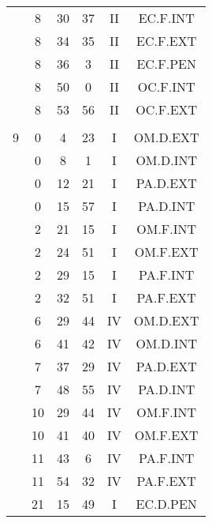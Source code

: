 \documentclass[12pt, a4paper]{article}
\begin{document}
\begin{multicols}{3}
{\begin{tabular}{c c c c c c}
	 	 	 	 & 8 & 30 & 37 & II & EC.F.INT\\%
	 	 	 	 & 8 & 34 & 35 & II & EC.F.EXT\\%
	 	 	 	 & 8 & 36 & 3 & II & EC.F.PEN\\%
	 	 	 	 & 8 & 50 & 0 & II & OC.F.INT\\%
	 	 	 	 & 8 & 53 & 56 & II & OC.F.EXT\\%
	 	 	 	 & & & & & \\%
	 	 	 	9 & 0 & 4 & 23 & I & OM.D.EXT\\%
	 	 	 	 & 0 & 8 & 1 & I & OM.D.INT\\%
	 	 	 	 & 0 & 12 & 21 & I & PA.D.EXT\\%
	 	 	 	 & 0 & 15 & 57 & I & PA.D.INT\\%
	 	 	 	 & 2 & 21 & 15 & I & OM.F.INT\\%
	 	 	 	 & 2 & 24 & 51 & I & OM.F.EXT\\%
	 	 	 	 & 2 & 29 & 15 & I & PA.F.INT\\%
	 	 	 	 & 2 & 32 & 51 & I & PA.F.EXT\\%
	 	 	 	 & 6 & 29 & 44 & IV & OM.D.EXT\\%
	 	 	 	 & 6 & 41 & 42 & IV & OM.D.INT\\%
	 	 	 	 & 7 & 37 & 29 & IV & PA.D.EXT\\%
	 	 	 	 & 7 & 48 & 55 & IV & PA.D.INT\\%
	 	 	 	 & 10 & 29 & 44 & IV & OM.F.INT\\%
	 	 	 	 & 10 & 41 & 40 & IV & OM.F.EXT\\%
	 	 	 	 & 11 & 43 & 6 & IV & PA.F.INT\\%
	 	 	 	 & 11 & 54 & 32 & IV & PA.F.EXT\\%
	 	 	 	 & 21 & 15 & 49 & I & EC.D.PEN\\%

\end{tabular}}
\end{multicols}
\end{document}
